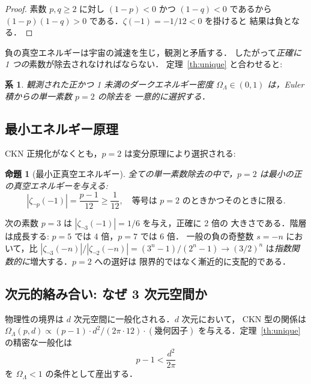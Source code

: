 \documentclass[11pt,a4paper]{article}
\newtheorem{proposition}{命題}
\newtheorem{corollary}{系}
\begin{document}
\begin{proof}
素数 $p, q \geq 2$ に対し $(1-p) < 0$ かつ $(1-q) < 0$ であるから
$(1-p)(1-q) > 0$ である．$\zeta(-1) = -1/12 < 0$ を掛けると
結果は負となる．
\end{proof}

負の真空エネルギーは宇宙の減速を生じ，観測と矛盾する．
したがって\emph{正確に 1 つの}素数が除去されなければならない．
定理~\ref{th:unique} と合わせると:

\begin{corollary}
観測された正かつ 1 未満のダークエネルギー密度
$\Omega_\Lambda \in (0, 1)$ は，Euler 積からの単一素数 $p = 2$ の除去を
一意的に選択する．
\end{corollary}

\subsection{最小エネルギー原理}

CKN 正規化がなくとも，$p = 2$ は変分原理により選択される:

\begin{proposition}[最小正真空エネルギー]
全ての単一素数除去の中で，$p = 2$ は最小の正の真空エネルギーを与える:
\begin{equation}
|\zeta_{\neg p}(-1)| = \frac{p-1}{12} \geq \frac{1}{12},
\quad \text{等号は } p = 2 \text{ のときかつそのときに限る}.
\end{equation}
\end{proposition}

次の素数 $p = 3$ は $|\zeta_{\neg 3}(-1)| = 1/6$ を与え，正確に 2 倍の
大きさである．階層は成長する: $p = 5$ では 4 倍，$p = 7$ では 6 倍．
一般の負の奇整数 $s = -n$ において，比
$|\zeta_{\neg 3}(-n)|/|\zeta_{\neg 2}(-n)| = (3^n - 1)/(2^n - 1)
\to (3/2)^n$ は\emph{指数関数的に}増大する．$p = 2$ への選好は
限界的ではなく漸近的に支配的である．

\subsection{次元的絡み合い: なぜ 3 次元空間か}

物理性の境界は $d$ 次元空間に一般化される．$d$ 次元において，
CKN 型の関係は $\Omega_\Lambda(p, d) \propto (p-1) \cdot d^2/(2\pi \cdot 12)
\cdot (\text{幾何因子})$ を与える．定理~\ref{th:unique} の精密な一般化は
\begin{equation}\label{eq:dim-bound}
p - 1 < \frac{d^2}{2\pi}
\end{equation}
を $\Omega_\Lambda < 1$ の条件として産出する．
\end{document}
